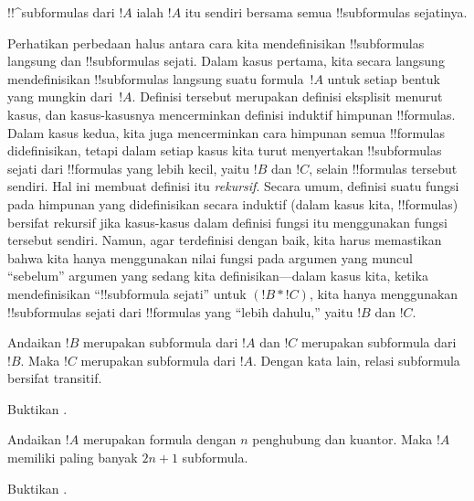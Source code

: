 \documentclass[../../../include/open-logic-section]{subfiles}
\begin{document}
\begin{defn}[!!^{subformula}]
!!^{subformula}s dari $!A$ ialah $!A$ itu sendiri bersama semua
!!{subformula}s sejatinya.
\end{defn}

\begin{explain}
Perhatikan perbedaan halus antara cara kita mendefinisikan !!{subformula}s
langsung dan !!{subformula}s sejati. Dalam kasus pertama, kita secara
langsung mendefinisikan !!{subformula}s langsung suatu formula~$!A$ untuk
setiap bentuk yang mungkin dari~$!A$. Definisi tersebut merupakan definisi
eksplisit menurut kasus, dan kasus-kasusnya mencerminkan definisi induktif
himpunan !!{formula}s. Dalam kasus kedua, kita juga mencerminkan cara
himpunan semua !!{formula}s didefinisikan, tetapi dalam setiap kasus kita
turut menyertakan !!{subformula}s sejati dari !!{formula}s yang lebih kecil,
yaitu $!B$ dan $!C$, selain !!{formula}s tersebut sendiri. Hal ini membuat
definisi itu \emph{rekursif}. Secara umum, definisi suatu fungsi pada
himpunan yang didefinisikan secara induktif (dalam kasus kita,
!!{formula}s) bersifat rekursif jika kasus-kasus dalam definisi fungsi itu
menggunakan fungsi tersebut sendiri. Namun, agar terdefinisi dengan baik,
kita harus memastikan bahwa kita hanya menggunakan nilai fungsi pada
argumen yang muncul ``sebelum'' argumen yang sedang kita definisikan---dalam
kasus kita, ketika mendefinisikan ``!!{subformula} sejati'' untuk $(!B
\ast !C)$, kita hanya menggunakan !!{subformula}s sejati dari
!!{formula}s yang ``lebih dahulu,'' yaitu $!B$ dan $!C$.
\end{explain}

\begin{prop}
Andaikan $!B$ merupakan subformula dari $!A$ dan $!C$ merupakan subformula
dari $!B$. Maka $!C$ merupakan subformula dari $!A$. Dengan kata lain,
relasi subformula bersifat transitif.
\end{prop}

\begin{prob}
Buktikan .
\end{prob}

\begin{prop}
Andaikan $!A$ merupakan formula dengan $n$ penghubung dan kuantor. Maka
$!A$ memiliki paling banyak $2n+1$ subformula.
\end{prop}

\begin{prob}
Buktikan .
\end{prob}
\end{document}

